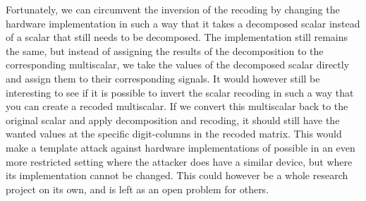 %
Fortunately, we can circumvent the inversion of the recoding by changing the hardware implementation in such a way that it takes a decomposed scalar instead of a scalar that still needs to be decomposed. 
The implementation still remains the same, but instead of assigning the results of the decomposition to the corresponding multiscalar, we take the values of the decomposed scalar directly and assign them to their corresponding signals.
It would however still be interesting to see if it is possible to invert the scalar recoding in such a way that you can create a recoded multiscalar.
If we convert this multiscalar back to the original scalar and apply decomposition and recoding, it should still have the wanted values at the specific digit-columns in the recoded matrix.
This would make a template attack against hardware implementations of {\fourq} possible in an even more restricted setting where the attacker does have a similar device, but where its implementation cannot be changed. 
This could however be a whole research project on its own, and is left as an open problem for others.